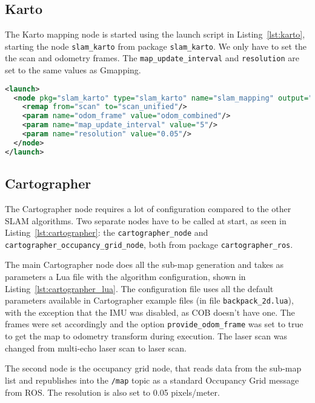 \subsection{Karto}

The Karto mapping node is started using the launch script in Listing~\ref{lst:karto}, starting the node \texttt{slam\_karto} from package \texttt{slam\_karto}. We only have to set the the scan and odometry frames. The \texttt{map\_update\_interval} and \texttt{resolution} are set to the same values as Gmapping.

\begin{lstlisting}[caption={Karto launch file.},label={lst:karto},language=XML]
<launch>
  <node pkg="slam_karto" type="slam_karto" name="slam_mapping" output="screen">
    <remap from="scan" to="scan_unified"/>
    <param name="odom_frame" value="odom_combined"/>
    <param name="map_update_interval" value="5"/>
    <param name="resolution" value="0.05"/>
  </node>
</launch>
\end{lstlisting}

\subsection{Cartographer}

The Cartographer node requires a lot of configuration compared to the other SLAM algorithms. Two separate nodes have to be called at start, as seen in Listing~\ref{lst:cartographer}: the \texttt{cartographer\_node} and \texttt{cartographer\_occupancy\_grid\_node}, both from package \texttt{cartographer\_ros}.

The main Cartographer node does all the sub-map generation and takes as parameters a Lua file with the algorithm configuration, shown in Listing~\ref{lst:cartographer_lua}. The configuration file uses all the default parameters available in Cartographer example files (in file \texttt{backpack\_2d.lua}), with the exception that the IMU was disabled, as COB doesn't have one. The frames were set accordingly and the option \texttt{provide\_odom\_frame} was set to true to get the map to odometry transform during execution. The laser scan was changed from multi-echo laser scan to laser scan.

The second node is the occupancy grid node, that reads data from the sub-map list and republishes into the \texttt{/map} topic as a standard Occupancy Grid message from ROS. The resolution is also set to 0.05 pixels/meter.

